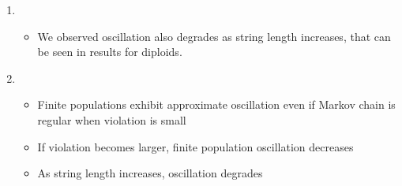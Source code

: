 \documentclass{article}
\begin{document}
\begin{enumerate}
\begin{itemize}
  \end{itemize}
  
\item
  \begin{itemize}
  \item We observed oscillation also degrades as string length increases, that can be seen in results for diploids.
  
  \end{itemize}
  
\item
  \begin{itemize}
  \item Finite populations exhibit approximate oscillation even if Markov chain is regular when violation is small
  \item If violation becomes larger, finite population oscillation decreases
  \item As string length increases, oscillation degrades
  \end{itemize}
  
  
% 
%   


\end{enumerate}
\end{document}
